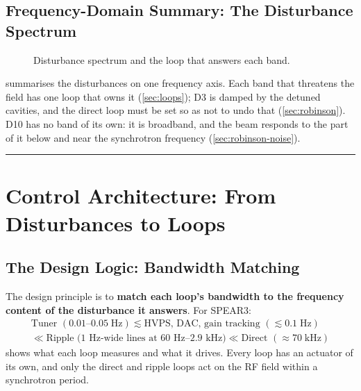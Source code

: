 \subsection{Frequency-Domain Summary: The Disturbance Spectrum}\label{sec:dist-spectrum}


\begin{figure}[tbp]
\centering
\begin{fitpicture}\end{fitpicture}
\caption{Disturbance spectrum and the loop that answers each band.}\label{fig:disturbance-spectrum}
\end{figure}

 summarises the disturbances on one frequency axis. Each band that threatens the field has one loop that owns it (\cref{sec:loops}); D3 is damped by the detuned cavities, and the direct loop must be set so as not to undo that (\cref{sec:robinson}). D10 has no band of its own: it is broadband, and the beam responds to the part of it below and near the synchrotron frequency (\cref{sec:robinson-noise}).

\begin{center}\rule{0.5\linewidth}{0.5pt}\end{center}

\section{Control Architecture: From Disturbances to Loops}\label{sec:architecture}


\subsection{The Design Logic: Bandwidth Matching}\label{sec:arch-bandwidth}


The design principle is to \textbf{match each loop's bandwidth to the frequency content of the disturbance it answers}. For SPEAR3:
\begin{multline*}
\text{Tuner } (0.01\text{--}0.05\;\text{Hz}) \lesssim \text{HVPS, DAC, gain tracking } (\lesssim 0.1\;\text{Hz}) \\
\ll \text{Ripple (1 Hz-wide lines at 60 Hz--2.9 kHz)} \ll \text{Direct } (\approx 70\;\text{kHz})
\end{multline*}
 shows what each loop measures and what it drives. Every loop has an actuator of its own, and only the direct and ripple loops act on the RF field within a synchrotron period.

